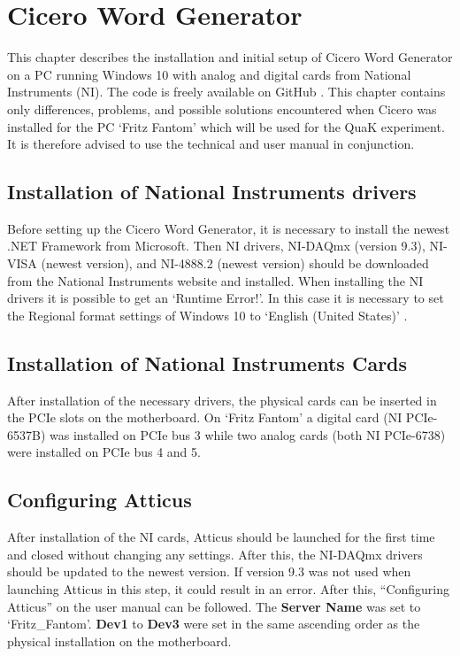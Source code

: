 
\chapter{Cicero Word Generator}\label{chap:Cicero, Cicero Word Generator}
This chapter describes the installation and initial setup of Cicero Word Generator \autocite{keshet2013distributed} on a PC running Windows 10 with analog and digital cards from National Instruments (NI). The code is freely available on GitHub \autocite{akeshet:Github}. This chapter contains only differences, problems, and possible solutions encountered when Cicero was installed for the PC `Fritz Fantom' which will be used for the QuaK experiment. It is therefore advised to use the technical and user manual \autocite{akeshet:manual} in conjunction.

\section{Installation of National Instruments drivers}\label{sec:Cicero, Installation of National Instruments drivers}
Before setting up the Cicero Word Generator, it is necessary to install the newest .NET Framework \autocite{microsoft:download.net} from Microsoft. Then NI drivers, NI-DAQmx (version 9.3), NI-VISA (newest version), and NI-4888.2 (newest version) should be downloaded from the National Instruments website \autocite{ni:drivers} and installed. When installing the NI drivers it is possible to get an `Runtime Error!'. In this case it is necessary to set the Regional format settings of Windows 10 to `English (United States)' \autocite{ni:runtimeerror}.

\section{Installation of National Instruments Cards}\label{sec:Cicero, Installation of National Instruments Cards}
After installation of the necessary drivers, the physical cards can be inserted in the PCIe slots on the motherboard. On `Fritz Fantom' a digital card (NI PCIe-6537B) was installed on PCIe bus 3 while two analog cards (both NI PCIe-6738) were installed on PCIe bus 4 and 5.

\section{Configuring Atticus}\label{sec:Cicero, Configuring Atticus}
After installation of the NI cards, Atticus should be launched for the first time and closed without changing any settings. After this, the NI-DAQmx drivers should be updated to the newest version. If version 9.3 was not used when launching Atticus in this step, it could result in an error. After this, ``Configuring Atticus'' on the user manual can be followed. The \textbf{Server Name} was set to `Fritz\_Fantom'. \textbf{Dev1} to \textbf{Dev3} were set in the same ascending order as the physical installation on the motherboard.

